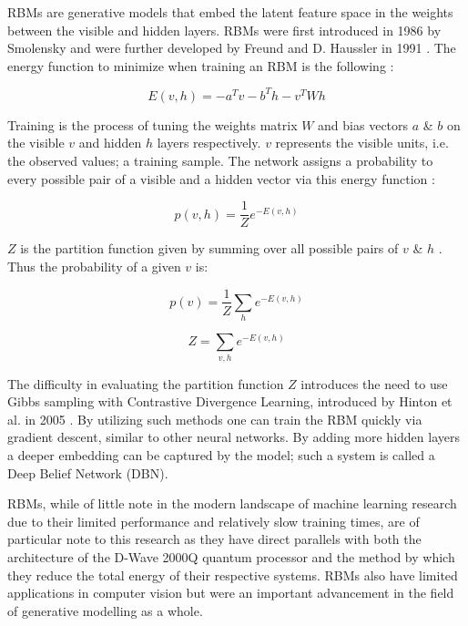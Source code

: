 \documentclass[%
 reprint,
 amsmath,amssymb,
 aps,
]{revtex4-2}
\begin{document}
RBMs are generative models that embed the latent feature space in the weights between the visible and hidden layers. RBMs were first introduced in 1986 by Smolensky and were further developed by Freund and D. Haussler in 1991 \cite{Smolensky1986InformationPI} \cite{NIPS1991_33e8075e}. The energy function to minimize when training an RBM is the following \cite{hopfield}:

\begin{equation}
E(v, h) = -a^Tv -b^Th -v^TWh
\label{eq:rbmEnergy}
\end{equation}



Training is the process of tuning the weights matrix $W$ and bias vectors $a$ \& $b$ on the visible $v$ and hidden $h$ layers respectively. $v$ represents the visible units, i.e. the observed values; a training sample. The network assigns a probability to every possible pair of a visible and a hidden vector via this energy function \cite{Hinton2012}:

\begin{equation}
p(v, h) = \frac{1}{Z}e^{-E(v,h)}
\end{equation}



$Z$ is the partition function given by summing over all possible pairs of $v$ \& $h$ \cite{Hinton2012}. Thus the probability of a given $v$ is:

\begin{equation}
p(v) = \frac{1}{Z}\sum_{h} e^{-E(v,h)}
\end{equation}

\begin{equation}
Z = \sum_{v,h}e^{-E(v,h)}
\end{equation}



The difficulty in evaluating the partition function $Z$ introduces the need to use Gibbs sampling with Contrastive Divergence Learning, introduced by Hinton et al. in 2005 \cite{CarreiraPerpin2005OnCD}. By utilizing such methods one can train the RBM quickly via gradient descent, similar to other neural networks. By adding more hidden layers a deeper embedding can be captured by the model; such a system is called a Deep Belief Network (DBN).


RBMs, while of little note in the modern landscape of machine learning research due to their limited performance and relatively slow training times, are of particular note to this research as they have direct parallels with both the architecture of the D-Wave 2000Q quantum processor and the method by which they reduce the total energy of their respective systems. RBMs also have limited applications in computer vision but were an important advancement in the field of generative modelling as a whole.
\end{document}
